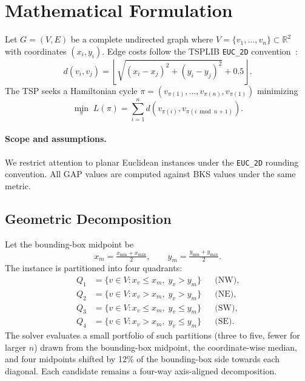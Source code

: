 \documentclass[runningheads]{llncs}
\begin{document}
\section{Mathematical Formulation}
\label{sec:formulation}

Let $G=(V,E)$ be a complete undirected graph where
$V=\{v_1,\dots,v_n\}\subset\mathbb{R}^2$ with coordinates
$(x_i,y_i)$. Edge costs follow the TSPLIB \texttt{EUC\_2D}
convention~\cite{reinelt1991tsplib}:
\begin{equation}
 d(v_i,v_j)=\left\lfloor\sqrt{(x_i-x_j)^2+(y_i-y_j)^2}+0.5\right\rfloor.
 \label{eq:dist}
\end{equation}
The TSP seeks a Hamiltonian cycle
$\pi=(v_{\pi(1)},\dots,v_{\pi(n)},v_{\pi(1)})$ minimizing
\begin{equation}
 \min_{\pi}\;L(\pi)=\sum_{i=1}^{n}
 d\!\left(v_{\pi(i)},v_{\pi(i\bmod n+1)}\right).
 \label{eq:tsp}
\end{equation}

\paragraph{Scope and assumptions.}
We restrict attention to planar Euclidean instances under the
\texttt{EUC\_2D} rounding convention. All GAP values are computed
against BKS values under the same metric.

\subsection{Geometric Decomposition}

Let the bounding-box midpoint be
\begin{equation}
 x_m=\tfrac{x_{\min}+x_{\max}}{2}, \qquad
 y_m=\tfrac{y_{\min}+y_{\max}}{2}.
\end{equation}
The instance is partitioned into four quadrants:
\begin{align}
Q_1&=\{v\in V: x_v\le x_m,\; y_v>y_m\}  &&\text{(NW)},\\
Q_2&=\{v\in V: x_v>x_m,\; y_v>y_m\}    &&\text{(NE)},\\
Q_3&=\{v\in V: x_v\le x_m,\; y_v\le y_m\}&&\text{(SW)},\\
Q_4&=\{v\in V: x_v>x_m,\; y_v\le y_m\} &&\text{(SE)}.
\end{align}
The solver evaluates a small portfolio of such partitions (three to
five, fewer for larger $n$) drawn from the bounding-box midpoint, the
coordinate-wise median, and four midpoints shifted by 12\% of the
bounding-box side towards each diagonal. Each
candidate remains a four-way axis-aligned decomposition.
\end{document}
